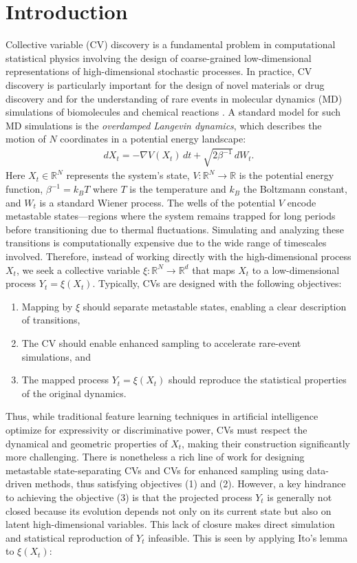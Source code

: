 \documentclass[reqno, 12pt]{article}
\begin{document}
\section{Introduction}
\label{sec: introduction}
Collective variable (CV) discovery is a fundamental problem in computational statistical physics involving the design of coarse-grained low-dimensional representations of high-dimensional stochastic processes. In practice, CV discovery is particularly important for the design of novel materials \cite{neha2022collective, zhang2019improving, karmakar2021collective} or drug discovery \cite{cuchillo2015collective, alonso2006combining} and for the understanding of rare events in molecular dynamics (MD) simulations of biomolecules and chemical reactions \cite{yang2019enhanced, paul2019phase, valsson2016enhancing}. A standard model for such MD simulations is the \emph{overdamped Langevin dynamics}, which describes the motion of $N$ coordinates in a potential energy landscape: 
\begin{align}
    dX_t = -\nabla V(X_t)\,dt + \sqrt{2\beta^{-1}}\,dW_t. \label{eq: OLD}
\end{align}
Here $X_t \in \mathbb{R}^{N}$ represents the system's state, $V: \mathbb{R}^{N} \to \mathbb{R}$ is the potential energy function, $\beta^{-1} = k_B T$ where $T$ is the temperature and $k_B$ the Boltzmann constant, and \( W_t \) is a standard Wiener process. The wells of the potential $V$ encode metastable states—regions where the system remains trapped for long periods before transitioning due to thermal fluctuations. Simulating and analyzing these transitions is computationally expensive due to the wide range of timescales involved. Therefore, instead of working directly with the high-dimensional process $X_t$, we seek a collective variable $\xi: \mathbb{R}^{N} \to \mathbb{R}^d$ that maps $X_t$ to a low-dimensional process  $Y_t = \xi(X_t)$. Typically, CVs are designed with the following objectives:  
\begin{enumerate}
    \item Mapping by $\xi$ should separate metastable states, enabling a clear description of transitions,  
    \item The CV should enable enhanced sampling to accelerate rare-event simulations, and  
    \item The mapped process $Y_t = \xi(X_t)$ should reproduce the statistical properties of the original dynamics.    
\end{enumerate}
Thus, while traditional feature learning techniques in artificial intelligence optimize for expressivity or discriminative power, CVs must respect the dynamical and geometric properties of $X_t$, making their construction significantly more challenging. There is nonetheless a rich line of work for designing metastable state-separating CVs and CVs for enhanced sampling using data-driven methods, thus satisfying objectives (1) and (2). However, a key hindrance to achieving the objective (3) is that the projected process $Y_t$ is generally not closed because its evolution depends not only on its current state but also on latent high-dimensional variables. This lack of closure makes direct simulation and statistical reproduction of $Y_t$ infeasible. This is seen by applying Ito's lemma to $\xi(X_t)$: 
\end{document}
